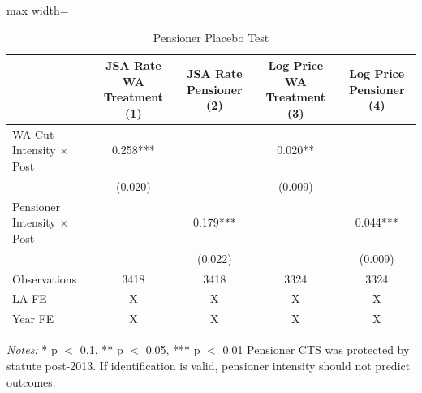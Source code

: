 \begin{table}
\centering
\caption{Pensioner Placebo Test}
\centering
\begin{adjustbox}{max width=\textwidth}
\begin{tabular}[t]{lcccc}
\toprule
  & JSA Rate
WA Treatment
(1) & JSA Rate
Pensioner
(2) & Log Price
WA Treatment
(3) & Log Price
Pensioner
(4)\\
\midrule
WA Cut Intensity $\times$ Post & \num{0.258}*** &  & \num{0.020}** & \\
 & (\num{0.020}) &  & (\num{0.009}) & \\
Pensioner Intensity $\times$ Post &  & \num{0.179}*** &  & \num{0.044}***\\
 &  & (\num{0.022}) &  & (\num{0.009})\\
\midrule
Observations & \num{3418} & \num{3418} & \num{3324} & \num{3324}\\
LA FE & X & X & X & X\\
Year FE & X & X & X & X\\
\bottomrule

\end{tabular}
\end{adjustbox}
\begin{flushleft}
\footnotesize
\textit{Notes:} * p $<$ 0.1, ** p $<$ 0.05, *** p $<$ 0.01 Pensioner CTS was protected by statute post-2013. If identification is valid, pensioner intensity should not predict outcomes.
\end{flushleft}
\end{table}

